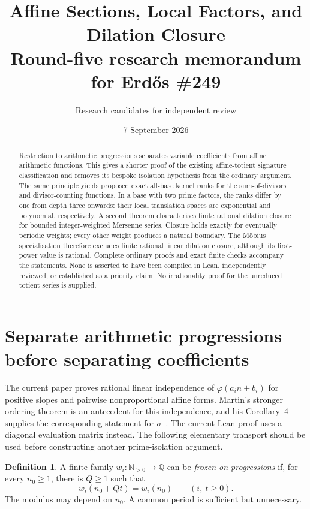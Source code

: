 \documentclass[11pt,a4paper]{article}
\title{Affine Sections, Local Factors, and Dilation Closure\\[4pt]\large Round-five research memorandum for Erd\H{o}s \#249}
\author{Research candidates for independent review}
\date{7 September 2026}
\theoremstyle{definition}\newtheorem{definition}[theorem]{Definition}
\theoremstyle{remark}\newtheorem*{remark}{Remark}
\newcommand{\N}{\mathbb N}\newcommand{\Q}{\mathbb Q}\newcommand{\Z}{\mathbb Z}\newcommand{\C}{\mathbb C}
\newcommand{\ph}{\varphi}\newcommand{\Span}{\operatorname{span}}\newcommand{\ord}{\operatorname{ord}}
\begin{document}
\maketitle
\begin{abstract}
Restriction to arithmetic progressions separates variable coefficients from affine arithmetic functions. This gives a shorter proof of the existing affine-totient signature classification and removes its bespoke isolation hypothesis from the ordinary argument. The same principle yields proposed exact all-base kernel ranks for the sum-of-divisors and divisor-counting functions. In a base with two prime factors, the ranks differ by one from depth three onwards: their local translation spaces are exponential and polynomial, respectively. A second theorem characterises finite rational dilation closure for bounded integer-weighted Mersenne series. Closure holds exactly for eventually periodic weights; every other weight produces a natural boundary. The M\"obius specialisation therefore excludes finite rational linear dilation closure, although its first-power value is rational. Complete ordinary proofs and exact finite checks accompany the statements. None is asserted to have been compiled in Lean, independently reviewed, or established as a priority claim. No irrationality proof for the unreduced totient series is supplied.
\end{abstract}

\section{Separate arithmetic progressions before separating coefficients}

The current paper proves rational linear independence of
$\ph(a_i n+b_i)$ for positive slopes and pairwise nonproportional affine forms.
Martin's stronger ordering theorem is an antecedent for this independence, and
his Corollary~4 supplies the corresponding statement for $\sigma$~\cite{martin}.
The current Lean proof uses a diagonal evaluation matrix instead.
The following elementary transport should be used before constructing another
prime-isolation argument.

\begin{definition}
A finite family $w_i:\N_{>0}\to\Q$ can be \emph{frozen on progressions} if, for
every $n_0\ge1$, there is $Q\ge1$ such that
\[
 w_i(n_0+Qt)=w_i(n_0)\qquad(i,\ t\ge0).
\]
The modulus may depend on $n_0$. A common period is sufficient but unnecessary.
\end{definition}
\end{document}
